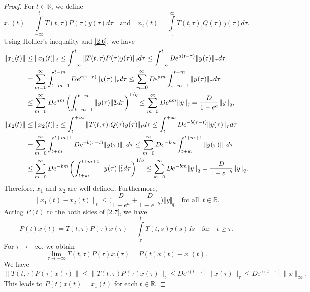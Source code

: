 \documentclass[10pt,a4paper]{amsart}
\def\r{\mathbb{R}}
\begin{document}
\begin{proof}
For $t\in \mathbb{R}$, we define
$$ x_1(t)=\displaystyle\int\limits_{-\infty}^{t}T(t,\tau)P(\tau)y(\tau)d\tau \quad \text{and}\quad  x_2(t)=\displaystyle\int\limits_{t}^{\infty}T(t,\tau)_|Q(\tau)y(\tau)d\tau.$$
Using Holder's inequality and \eqref{2.6}, we have
\begin{align*}
\|x_1(t)\| &\le \Vert x_1(t)\Vert _t  \le \displaystyle \int_{-\infty}^{t} \Vert T(t,\tau)P(\tau)y(\tau)\Vert _t d\tau  
\le \displaystyle \int_{-\infty}^{t} D e^{{a}(t-\tau )}\Vert y(\tau)\Vert _{\tau} d\tau \nonumber \\
&= \displaystyle\sum_{m=0}^{\infty} \displaystyle \int_{t-m-1}^{t-m} D e^{{a}(t-\tau )}\Vert y(\tau)\Vert _{\tau} d\tau 
\leq \displaystyle\sum_{m=0}^{\infty}D e^{{a}m} \displaystyle \int_{t-m-1}^{t-m} \Vert y(\tau)\Vert _{\tau} d\tau \nonumber  \\
&\le \displaystyle\sum_{m=0}^{\infty}D e^{{a}m} \left( \displaystyle \int_{t-m-1}^{t-m} \Vert y(\tau)\Vert _{\tau}^q d\tau \right)^{1/q} 
\leq \displaystyle\sum_{m=0}^{\infty}D e^{{a}m} \Vert y\Vert_q 
=\frac{D}{1-e^{a}}\Vert y\Vert _q, \\
\|x_2(t)\| &\le \Vert x_2(t)\Vert _t  \le \displaystyle \int_{t}^{+\infty} \Vert T(t,\tau)_|Q(\tau)y(\tau)\Vert _t d\tau  
\le \displaystyle \int_{t}^{+\infty} D e^{-{b}(\tau -t)}\Vert y(\tau)\Vert _{\tau} d\tau \nonumber \\
&= \displaystyle\sum_{m=0}^{\infty} \displaystyle \int_{t+m}^{t+m+1} D e^{-{b}(\tau -t)}\Vert y(\tau)\Vert _{\tau} d\tau 
\leq \displaystyle\sum_{m=0}^{\infty}D e^{-{b}m} \displaystyle \int_{t+m}^{t+m+1} \Vert y(\tau)\Vert _{\tau} d\tau \nonumber  \\
&\le \displaystyle\sum_{m=0}^{\infty}D e^{-{b}m} \left( \displaystyle \int_{t+m}^{t+m+1} \Vert y(\tau)\Vert _{\tau}^q d\tau \right)^{1/q} 
\leq \displaystyle\sum_{m=0}^{\infty}D e^{-{b}m} \Vert y\Vert_q 
=\frac{D}{1-e^{-{b}}}\Vert y\Vert _q. \notag
\end{align*}
Therefore, $x_1$ and $x_2$ are well-defined. Furthermore,
\begin{equation}\label{eq1}
 \|x_1(t)-x_2(t)\|_t \le \Big(\frac{D}{1-e^{a}} + \frac{D}{1-e^{-{b}}}\Big) \Vert y\Vert _q \quad \text{for all }\, t\in \r.
\end{equation}
Acting $P(t)$ to the both sides of \eqref{2.7}, we have
$$ P(t)x(t)= T(t,\tau)P(\tau)x(\tau)+\displaystyle\int\limits_{\tau}^{t}T(t,s)y(s)ds  \quad  \text{for} \quad t\geq \tau.$$
For $\tau \to -\infty$, we obtain
$$ \lim_{\tau \to -\infty}T(t,\tau)P(\tau)x(\tau) =  P(t)x(t) - x_1(t).$$
We have
$$\|T(t,\tau)P(\tau)x(\tau)\| \le \|T(t,\tau)P(\tau)x(\tau)\|_{t} \le D e^{a(t-\tau)} \|x(\tau)\|_{\tau} \le D e^{a(t-\tau)} \|x\|_{\infty}.$$
This leads to $P(t)x(t) = x_1(t)$ for each $t \in \mathbb{R}$.


\end{proof}
\end{document}
